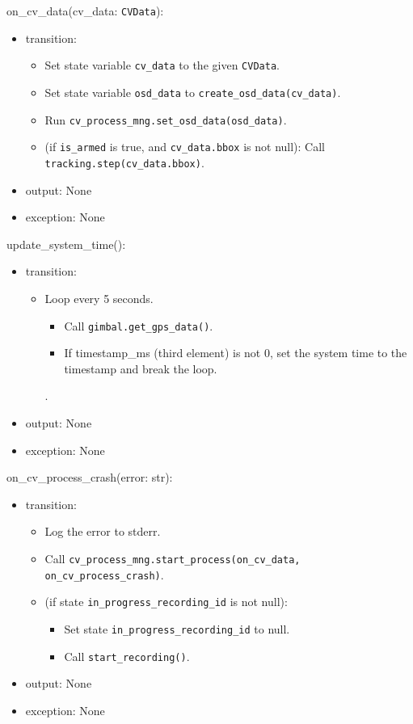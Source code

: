 \documentclass[12pt, titlepage]{article}
\begin{document}
\noindent on\_cv\_data(cv\_data: \texttt{CVData}):
\begin{itemize}
  \item transition:
        \begin{itemize}
          \item Set state variable \texttt{cv\_data} to the given \texttt{CVData}.
          \item Set state variable \texttt{osd\_data} to \texttt{create\_osd\_data(cv\_data)}.
          \item Run \texttt{cv\_process\_mng.set\_osd\_data(osd\_data)}.
          \item (if \texttt{is\_armed} is true, and \texttt{cv\_data.bbox} is not null): Call \texttt{tracking.step(cv\_data.bbox)}.
        \end{itemize}
  \item output: None
  \item exception: None
\end{itemize}

\noindent update\_system\_time():
\begin{itemize}
  \item transition:
        \begin{itemize}
          \item Loop every 5 seconds.
                \begin{itemize}
                  \item Call \texttt{gimbal.get\_gps\_data()}.
                  \item If timestamp\_ms (third element) is not 0, set the system time to the timestamp
                        and break the loop.
                \end{itemize}.
        \end{itemize}
  \item output: None
  \item exception: None
\end{itemize}

\noindent on\_cv\_process\_crash(error: str):
\begin{itemize}
  \item transition:
        \begin{itemize}
          \item Log the error to stderr.
          \item Call \texttt{cv\_process\_mng.start\_process(on\_cv\_data,
                  on\_cv\_process\_crash)}.
          \item (if state \texttt{in\_progress\_recording\_id} is not null):
                \begin{itemize}
                  \item Set state \texttt{in\_progress\_recording\_id} to null.
                  \item Call \texttt{start\_recording()}.
                \end{itemize}
        \end{itemize}
  \item output: None
  \item exception: None
\end{itemize}
\end{document}
